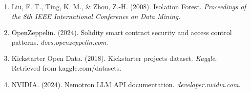 \begin{enumerate}
    \item Liu, F. T., Ting, K. M., \& Zhou, Z.-H. (2008). Isolation Forest. \textit{Proceedings of the 8th IEEE International Conference on Data Mining}.

    \item OpenZeppelin. (2024). Solidity smart contract security and access control patterns. \textit{docs.openzeppelin.com}.

    \item Kickstarter Open Data. (2018). Kickstarter projects dataset. \textit{Kaggle}. Retrieved from kaggle.com/datasets.

    \item NVIDIA. (2024). Nemotron LLM API documentation. \textit{developer.nvidia.com}.

\end{enumerate}
